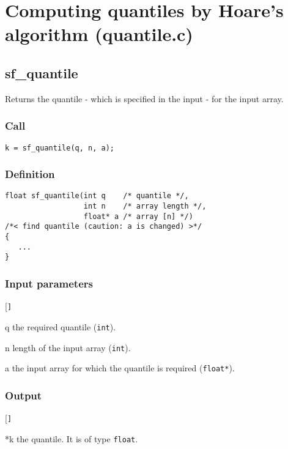 \section{Computing quantiles by Hoare's algorithm (quantile.c)}




\subsection{{sf\_quantile}}
Returns the quantile - which is specified in the input -  for the input array.

\subsubsection*{Call}
\begin{verbatim}k = sf_quantile(q, n, a);\end{verbatim}

\subsubsection*{Definition}
\begin{verbatim}
float sf_quantile(int q    /* quantile */, 
                  int n    /* array length */, 
                  float* a /* array [n] */) 
/*< find quantile (caution: a is changed) >*/ 
{
   ...
}
\end{verbatim}

\subsubsection*{Input parameters}
\begin{desclist}{\tt }{\quad}[\tt ]
   \setlength\itemsep{0pt}
   \item[q] the required quantile (\texttt{int}). 
   \item[n] length of the input array (\texttt{int}). 
   \item[a] the input array for which the quantile is required (\texttt{float*}).
\end{desclist}

\subsubsection*{Output}
\begin{desclist}{\tt }{\quad}[\tt ]
   \setlength\itemsep{0pt}
   \item[*k] the quantile. It is of type \texttt{float}.
\end{desclist}




